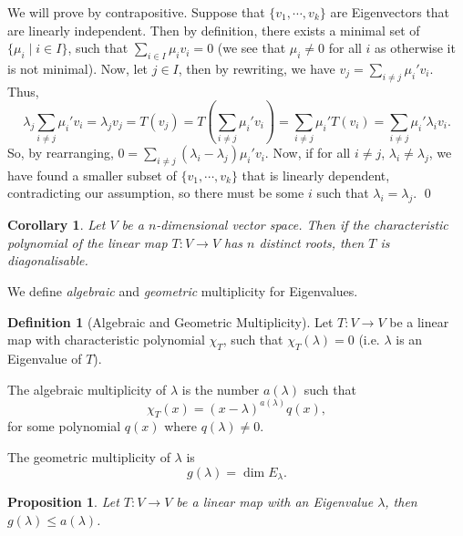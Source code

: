 \documentclass[
]{article}
\newtheorem{prop}{Proposition}[section]
\newtheorem{corollary}{Corollary}[theorem]
\theoremstyle{definition}
\newtheorem{definition}{Definition}[section]
\begin{document}
We will prove by contrapositive. Suppose that \(\{v_1, \cdots, v_k\}\)
are Eigenvectors that are linearly independent. Then by definition,
there exists a minimal set of \(\{\mu_i \mid i \in I\}\), such that
\(\sum_{i \in I} \mu_i v_i = 0\) (we see that \(\mu_i \neq 0\) for all
\(i\) as otherwise it is not minimal). Now, let \(j \in I\), then by
rewriting, we have \(v_j = \sum_{i \neq j}\mu_i' v_i\). Thus, \[
    \lambda_j \sum_{i \neq j} \mu_i' v_i = \lambda_j v_j = T(v_j)
      = T\left(\sum_{i \neq j} \mu_i' v_i\right) 
      = \sum_{i \neq j} \mu_i' T(v_i) 
      = \sum_{i \neq j} \mu_i' \lambda_i v_i.
  \] So, by rearranging,
\(0 = \sum_{i \neq j}(\lambda_i - \lambda_j)\mu_i' v_i\). Now, if for
all \(i \neq j\), \(\lambda_i \neq \lambda_j\), we have found a smaller
subset of \(\{v_1, \cdots, v_k\}\) that is linearly dependent,
contradicting our assumption, so there must be some \(i\) such that
\(\lambda_i = \lambda_j\). \qed

\begin{corollary}
  Let \(V\) be a \(n\)-dimensional vector space. Then if the characteristic 
  polynomial of the linear map \(T : V \to V\) has \(n\) distinct roots, then 
  \(T\) is diagonalisable. 
\end{corollary}

We define \emph{algebraic} and \emph{geometric} multiplicity for
Eigenvalues.

\begin{definition}[Algebraic and Geometric Multiplicity]
  Let \(T : V \to V\) be a linear map with characteristic polynomial \(\chi_T\),
  such that \(\chi_T(\lambda) = 0\) (i.e. \(\lambda\) is an Eigenvalue of \(T\)).

  The algebraic multiplicity of \(\lambda\) is the number \(a(\lambda)\) such 
  that
  \[\chi_T(x) = (x - \lambda)^{a(\lambda)} q(x),\]
  for some polynomial \(q(x)\) where \(q(\lambda) \neq 0\).

  The geometric multiplicity of \(\lambda\) is
  \[g(\lambda) = \dim E_{\lambda}.\]
\end{definition}

\begin{prop}
  Let \(T : V \to V\) be a linear map with an Eigenvalue \(\lambda\), then 
  \(g(\lambda) \le a(\lambda)\).
\end{prop}
\proof
\end{document}
